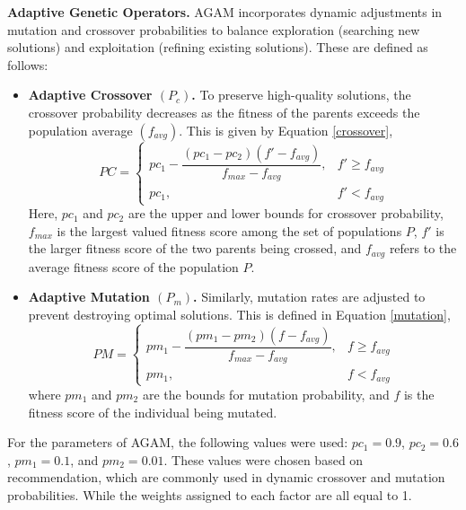 \textbf{Adaptive Genetic Operators.} AGAM incorporates dynamic adjustments in mutation and crossover probabilities to balance exploration (searching new solutions) and exploitation (refining existing solutions). These are defined as follows:
\begin{itemize}
    \item \textbf{Adaptive Crossover $ ( P _{c} )$.} To preserve high-quality solutions, the crossover probability decreases as the fitness of the parents exceeds the population average $ ( f _{avg} )$. This is given by Equation \ref{crossover},
    \begin{equation}
        \label{crossover}
        PC = \begin{cases}
            pc_1 - \dfrac{(pc_1 - pc_2)(f' - f_{avg})}{f_{max} - f_{avg}}, & f' \ge f_{avg} \\
            pc_1, & f' < f_{avg}
        \end{cases}
    \end{equation}
    Here, $pc_1$ and $pc_2$ are the upper and lower bounds for crossover probability, $f_{max}$ is the largest valued fitness score among the set of populations $P$, $f'$ is the larger fitness score of the two parents being crossed, and $f_{avg}$ refers to the average fitness score of the population $P$. 

    \item \textbf{Adaptive Mutation $ ( P _{m} )$.} Similarly, mutation rates are adjusted to prevent destroying optimal solutions. This is defined in Equation \ref{mutation},
    \begin{equation}
        \label{mutation}
        PM = \begin{cases}
            pm_1 - \dfrac{(pm_1 - pm_2)(f - f_{avg})}{f_{max} - f_{avg}}, & f \ge f_{avg} \\
            pm_1, & f < f_{avg}
        \end{cases}
    \end{equation}
    where $pm_1$ and $pm_2$  are the bounds for mutation probability, and $f$ is the fitness score of the individual being mutated.
\end{itemize}

For the parameters of AGAM, the following values were used: $pc_1 = 0.9$, $pc_2 = 0.6$, $pm_1 = 0.1$, and $pm_2 = 0.01$. These values were chosen based on \textcite{Yochum2020} recommendation, which are commonly used in dynamic crossover and mutation probabilities. While the weights assigned to each factor are all equal to 1.

